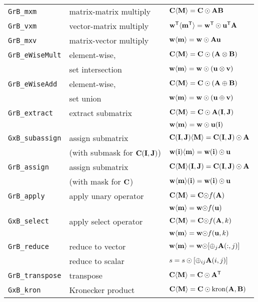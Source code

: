 \documentclass[12pt]{article}
\begin{document}
\vspace{0.05in}
{\footnotesize
\begin{tabular}{lll}
\hline
\verb'GrB_mxm'       & matrix-matrix multiply  & ${\bf C \langle M \rangle = C \odot AB}$ \\
\verb'GrB_vxm'       & vector-matrix multiply  & ${\bf w^{\sf T}\langle m^{\sf T}\rangle = w^{\sf T}\odot u^{\sf T}A}$ \\
\verb'GrB_mxv'       & matrix-vector multiply  & ${\bf w \langle m \rangle = w \odot Au}$ \\
\hline
\verb'GrB_eWiseMult' & element-wise,           & ${\bf C \langle M \rangle = C \odot (A \otimes B)}$ \\
                     & set intersection        & ${\bf w \langle m \rangle = w \odot (u \otimes v)}$ \\
\hline
\verb'GrB_eWiseAdd'  & element-wise,           & ${\bf C \langle M \rangle = C \odot (A \oplus  B)}$ \\
                     & set union               & ${\bf w \langle m \rangle = w \odot (u \oplus  v)}$ \\
\hline
\verb'GrB_extract'   & extract submatrix       & ${\bf C \langle M \rangle = C \odot A(I,J)}$ \\
                     &                         & ${\bf w \langle m \rangle = w \odot u(i)}$ \\
\hline
\verb'GxB_subassign' & assign submatrix        & ${\bf C (I,J) \langle M \rangle = C(I,J) \odot A}$ \\
                     & (with submask for ${\bf C(I,J)}$)
                                               & ${\bf w (i)   \langle m \rangle = w(i)   \odot u}$ \\
\hline
\verb'GrB_assign'    & assign submatrix        & ${\bf C \langle M \rangle (I,J) = C(I,J) \odot A}$ \\
                     & (with mask for ${\bf C}$)
                                               & ${\bf w \langle m \rangle (i)   = w(i)   \odot u}$ \\
\hline
\verb'GrB_apply'     & apply unary operator    & ${\bf C \langle M \rangle = C \odot} f{\bf (A)}$ \\
                     &                         & ${\bf w \langle m \rangle = w \odot} f{\bf (u)}$ \\
\hline
\verb'GxB_select'    & apply select operator   & ${\bf C \langle M \rangle = C \odot} f({\bf A},k)$ \\
                     &                         & ${\bf w \langle m \rangle = w \odot} f({\bf u},k)$ \\
\hline
\verb'GrB_reduce'    & reduce to vector        & ${\bf w \langle m \rangle = w \odot} [{\oplus}_j {\bf A}(:,j)]$ \\
                     & reduce to scalar        & $s = s \odot [{\oplus}_{ij}  {\bf A}(i,j)]$ \\
\hline
\verb'GrB_transpose' & transpose               & ${\bf C \langle M \rangle = C \odot A^{\sf T}}$ \\
\hline
\verb'GxB_kron'      & Kronecker product       & ${\bf C \langle M \rangle = C \odot \mbox{kron}(A, B)}$ \\
\hline
\end{tabular}
}
\end{document}
